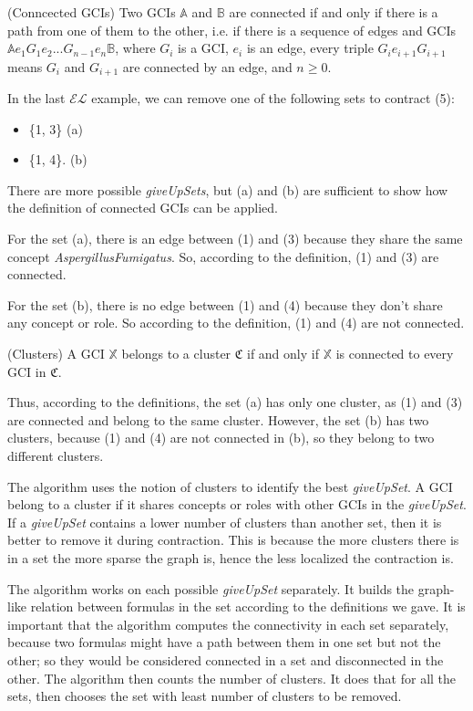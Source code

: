 \begin{defn}(Conncected GCIs)
Two GCIs $\mathbb{A}$ and $\mathbb{B}$ are connected if and only if there is a path from one of them to the other, i.e. if there is a sequence of edges and GCIs $\mathbb{A}e_1G_1e_2 ... G_{n-1}e_n\mathbb{B}$, where $G_i$ is a GCI, $e_i$ is an edge, every triple $G_ie_{i+1}G_{i+1}$ means $G_i$ and $G_{i+1}$ are connected by an edge, and $n \geq 0$.
\end{defn}

In the last $\mathcal{EL}$ example, we can remove one of the following sets to contract (5):
\begin{itemize}
\item \{1, 3\} (a)
\item \{1, 4\}. (b)
\end{itemize}

There are more possible \textit{giveUpSets}, but (a) and (b) are sufficient to show how the definition of connected GCIs can be applied. 

For the set (a), there is an edge between (1) and (3) because they share the same concept \textit{AspergillusFumigatus}. So, according to the definition, (1) and (3) are connected.

For the set (b), there is no edge between (1) and (4) because they don't share any concept or role. So according to the definition, (1) and (4) are not connected.

\begin{defn}(Clusters)
A GCI $\mathbb{X}$ belongs to a cluster $\mathfrak{C}$ if and only if $\mathbb{X}$ is connected to every GCI in $\mathfrak{C}$.
\end{defn}

Thus, according to the definitions, the set (a) has only one cluster, as (1) and (3) are connected and belong to the same cluster. However, the set (b) has two clusters, because (1) and (4) are not connected in (b), so they belong to two different clusters.

The algorithm uses the notion of clusters to identify the best \textit{giveUpSet}. A GCI belong to a cluster if it shares concepts or roles with other GCIs in the \textit{giveUpSet}. If a \textit{giveUpSet} contains a lower number of clusters than another set, then it is better to remove it during contraction. This is because the more clusters there is in a set the more sparse the graph is, hence the less localized the contraction is. 

The algorithm works on each possible \textit{giveUpSet} separately. It builds the graph-like relation between formulas in the set according to the definitions we gave. It is important that the algorithm computes the connectivity in each set separately, because two formulas might have a path between them in one set but not the other; so they would be considered connected in a set and disconnected in the other. The algorithm then counts the number of clusters. It does that for all the sets, then chooses the set with least number of clusters to be removed.

